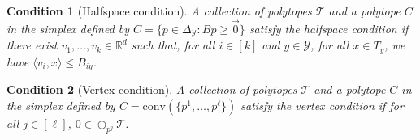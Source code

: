 \documentclass[anon]{colt2020} %
\newcommand{\reals}{\mathbb{R}}
\newcommand{\simplex}{\Delta_\Y}
\newcommand{\T}{\mathcal{T}}
\newcommand{\Y}{\mathcal{Y}}
\newcommand{\inprod}[2]{\langle #1, #2 \rangle}%
\newcommand{\conv}{\mathrm{conv}}
\newtheorem{condition}{Condition}
\begin{document}
\begin{condition}[Halfspace condition]\label{cond:H-condition}
	A collection of polytopes $\T$ and a polytope $C$ in the simplex defined by $C = \{p \in \simplex : Bp \geq \vec 0\}$ \emph{satisfy the halfspace condition} if there exist $v_1, \ldots, v_k \in \reals^d$ such that, for all $i \in [k]$ and $y \in \Y$, for all $x \in T_y$, we have $\inprod{v_i}{x} \leq B_{iy}$.
\end{condition}
\begin{condition}[Vertex condition]\label{cond:V-condition}
	A collection of polytopes $\T$ and a polytope $C$ in the simplex defined by $C = \conv(\{p^1, \ldots, p^\ell\})$ \emph{satisfy the vertex condition} if for all $j \in [\ell]$, $0 \in \oplus_{p^j} \T$. %
\end{condition}
\end{document}
